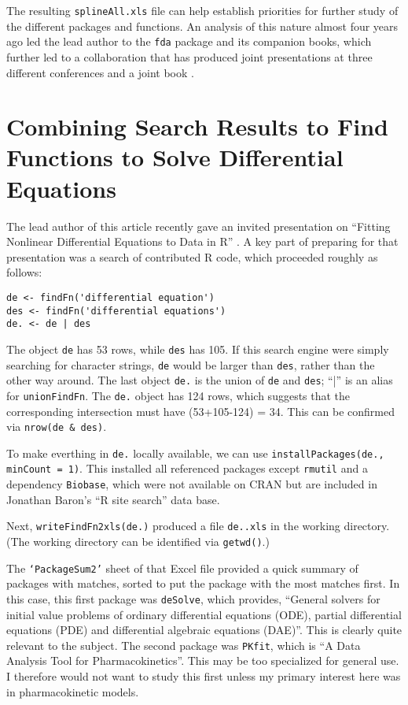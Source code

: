 The resulting {\tt splineAll.xls} file can help establish priorities 
for further study of the different packages and functions.  An 
analysis of this nature almost four years ago led the lead author 
to the {\tt fda} package and its companion books, which further 
led to a collaboration that has produced joint presentations at 
three different conferences and a joint book \citep{RHG09}.


\section*{Combining Search Results to Find Functions to Solve Differential Equations}

The lead author of this article recently gave an invited presentation
on ``Fitting Nonlinear Differential Equations to Data in R'' \citep{GHR09}.
A key part of preparing for that presentation was a search of 
contributed R code, which proceeded roughly as follows:

\begin{verbatim}
de <- findFn('differential equation')
des <- findFn('differential equations')
de. <- de | des
\end{verbatim}

The object {\tt de} has 53 rows, while {\tt des} has 105.
If this search engine were simply searching for character
strings, {\tt de} would be larger than {\tt des}, rather than
the other way around.  The last object {\tt de.} is the union
of {\tt de} and {\tt des};  ``|'' is an alias for {\tt unionFindFn}.
The {\tt de.} object has 124 rows, which suggests that
the corresponding intersection must have (53+105-124) = 34.
This can be confirmed via {\tt nrow(de \& des)}.

To make everthing in {\tt de.} locally available, we can use
{\tt installPackages(de., minCount = 1)}.  This installed all
referenced packages except {\tt rmutil} and a dependency {\tt Biobase},
which were not available on CRAN but are included in Jonathan
Baron's ``R site search'' data base.

Next, {\tt writeFindFn2xls(de.)} produced a file {\tt de..xls}
in the working directory.  (The working directory can be 
identified via {\tt getwd()}.)

The {\tt `PackageSum2'} sheet of that Excel file provided a quick
summary of packages with matches, sorted to put the package
with the most matches first.  In this case, this first package
was {\tt deSolve}, which provides, ``General solvers for initial
value problems of ordinary differential equations (ODE),
partial differential equations (PDE) and differential
algebraic equations (DAE)''.  This is clearly quite relevant
to the subject.  The second package was {\tt PKfit}, which
is ``A Data Analysis Tool for Pharmacokinetics''.  This may
be too specialized for general use.  I therefore would not
want to study this first unless my primary interest here was in
pharmacokinetic models.

